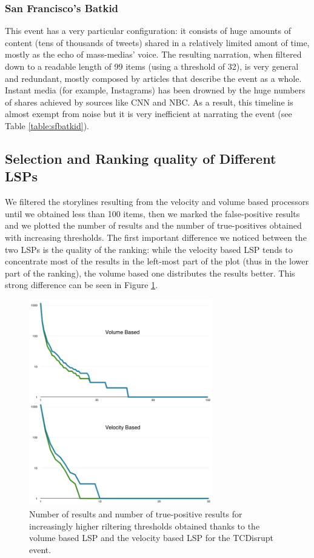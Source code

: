 \documentclass{sig-alternate}
\begin{document}
\subsubsection{San Francisco's Batkid}
This event has a very particular configuration: it consists of huge amounts of content (tens of thousands of tweets) shared in a relatively limited amont of time, mostly as the echo of mass-medias' voice. The resulting narration, when filtered down to a readable length of 99 items (using a threshold of 32), is very general and redundant, mostly composed by articles that describe the event as a whole. Instant media (for example, Instagrams) has been drowned by the huge numbers of shares achieved by sources like CNN and NBC. As a result, this timeline is almost exempt from noise but it is very inefficient at narrating the event (see Table \ref{table:sfbatkid}).

\subsection{Selection and Ranking quality of Different LSPs}
\label{sec:selection_and_ranking_quality}
We filtered the storylines resulting from the velocity and volume based processors until we obtained less than 100 items, then we marked the false-positive results and we plotted the number of results and the number of true-positives obtained with increasing thresholds. The first important difference we noticed between the two LSPs is the quality of the ranking: while the velocity based LSP tends to concentrate most of the results in the left-most part of the plot (thus in the lower part of the ranking), the volume based one distributes the results better. This strong difference can be seen in Figure \ref{fig:tcdisrupt_plots}.
\begin{figure}[htbp]
  \centering
  \includegraphics[width=8cm]{Figures/tcdisrupt_plots.png}
  \caption{Number of results and number of true-positive results for increasingly higher riltering thresholds obtained thanks to the volume based LSP and the velocity based LSP for the TCDisrupt event. }
  \label{fig:tcdisrupt_plots}
\end{figure}
\end{document}
